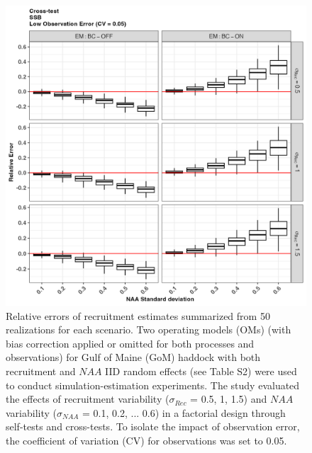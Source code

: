 \documentclass[
  12pt,
]{article}
\begin{document}
\begin{figure}[H]
\centering
\includegraphics[width=\textwidth]{Revised_Figures&Tables/SSB_low_cross_RE.PNG}
\caption{Relative errors of recruitment estimates summarized from 50 realizations for each scenario. Two operating models (OMs) (with bias correction applied or omitted for both processes and observations) for Gulf of Maine (GoM) haddock with both recruitment and $NAA$ IID random effects (see Table S2) were used to conduct simulation-estimation experiments. The study evaluated the effects of recruitment variability ($\sigma_{Rec}$ = 0.5, 1, 1.5) and $NAA$ variability ($\sigma_{NAA}$ = 0.1, 0.2, ... 0.6) in a factorial design through self-tests and cross-tests. To isolate the impact of observation error, the coefficient of variation (CV) for observations was set to 0.05.}
\label{fig:supp_SSB_low_cross_RE} 
\end{figure}
\end{document}
